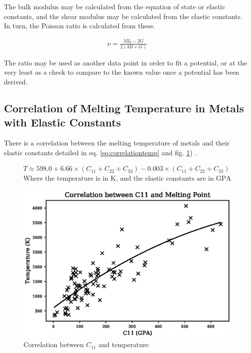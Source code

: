 The bulk modulus may be calculated from the equation of state or elastic constants, and the shear modulus may be calculated from the elastic constants.  In turn, the Poisson ratio is calculated from these.  

\begin{equation}
\begin{split}
\nu = \frac{3 B_0 - 2G}{2(3B+G)}
\end{split}
\label{eq:PoissonRatio2}
\end{equation}

The ratio may be used as another data point in order to fit a potential, or at the very least as a check to compare to the known value once a potential has been derived.


\FloatBarrier
\subsection{Correlation of Melting Temperature in Metals with Elastic Constants}

There is a correlation between the melting temperature of metals and their elastic constants detailed in eq. \ref{eq:correlationtemp} and fig. \ref{fig:c11correlation}) \cite{ElasticMeltingTemp}.  

\begin{equation}
\begin{split}
T \approx 598.0 + 6.66 \times (C_{11} + C_{22} + C_{33}) - 0.003 \times (C_{11} + C_{22} + C_{33}) \\
\text{Where the temperature is in K, and the elastic constants are in GPA}
\end{split}
\label{eq:correlationtemp}
\end{equation}

\begin{figure}[htbp]
  \begin{center}
    \includegraphics[scale=0.80]{chapters/interatomic_potential_fitting/plots/c11_temperature}%
    \caption{Correlation between $C_{11}$ and temperature}
    \label{fig:c11correlation}
  \end{center}
\end{figure}

